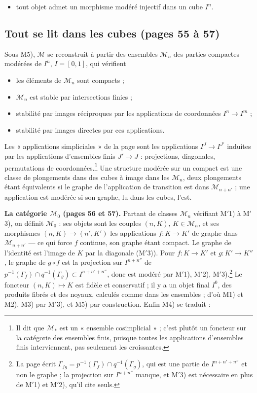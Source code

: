\documentclass[11pt,a4paper]{article}
\begin{document}
\begin{itemize}
\item[M5)] tout objet admet un morphisme modéré injectif dans un cube $I^n$.
\end{itemize}

\subsection*{Tout se lit dans les cubes (pages 55 à 57)}

Sous M5), $\mathcal{M}$ se reconstruit à partir des ensembles $\mathcal{M}_n$
des parties compactes modérées de $I^n$, $I = [0, 1]$, qui vérifient

\begin{itemize}
\item[M$'$0)] les éléments de $\mathcal{M}_n$ sont compacts ;
\item[M$'$1)] $\mathcal{M}_n$ est stable par intersections finies ;
\item[M$'$2)] stabilité par images réciproques par les applications de
  coordonnées $I^n \to I^m$ ;
\item[M$'$3)] stabilité par images directes par ces applications.
\end{itemize}

Les « applications simpliciales » de la page sont les applications
$I^J \to I^{J'}$ induites par les applications d'ensembles finis
$J' \to J$ : projections, diagonales, permutations de
coordonnées.\footnote{Il dit que $\mathcal{M}_*$ est un « ensemble
cosimplicial » ; c'est plutôt un foncteur sur la catégorie des ensembles finis,
puisque toutes les applications d'ensembles finis interviennent, pas seulement
les croissantes.} Une structure modérée sur un compact est une classe de
plongements dans des cubes à image dans les $\mathcal{M}_n$, deux plongements
étant équivalents si le graphe de l'application de transition est dans
$\mathcal{M}_{n+n'}$ ; une application est modérée si son graphe, lu dans les
cubes, l'est.

\textbf{La catégorie $\mathcal{M}_0$ (pages 56 et 57).} Partant de classes
$\mathcal{M}_n$ vérifiant M$'$1) à M$'$3), on définit $\mathcal{M}_0$ : ses
objets sont les couples $(n, K)$, $K \in \mathcal{M}_n$, et ses morphismes
$(n,K) \to (n',K')$ les applications $f : K \to K'$ de graphe dans
$\mathcal{M}_{n+n'}$ — ce qui force $f$ continue, son graphe étant compact. Le
graphe de l'identité est l'image de $K$ par la diagonale (M$'$3)). Pour
$f : K \to K'$ et $g : K' \to K''$, le graphe de $g \circ f$ est la
projection sur $I^{n+n''}$ de $p^{-1}(\Gamma_f) \cap q^{-1}(\Gamma_g) \subset
I^{n+n'+n''}$, donc est modéré par M$'$1), M$'$2), M$'$3).\footnote{La page
écrit $\Gamma_{fg} = p^{-1}(\Gamma_f) \cap q^{-1}(\Gamma_g)$, qui est une
partie de $I^{n+n'+n''}$ et non le graphe ; la projection sur $I^{n+n''}$
manque, et M$'$3) est nécessaire en plus de M$'$1) et M$'$2), qu'il cite seuls.}
Le foncteur $(n, K) \mapsto K$ est fidèle et conservatif ; il y a un objet final
$I^0$, des produits fibrés et des noyaux, calculés comme dans les ensembles ;
d'où M1) et M2), M3) par M$'$3), et M5) par construction. Enfin M4) se
traduit :
\end{document}
